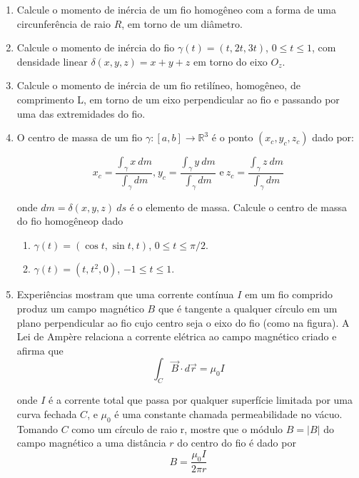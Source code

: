 \documentclass[11pt,a4paper]{article}
\begin{document}
\begin{enumerate}
\item Calcule o momento de inércia de um fio homogêneo com a forma de uma circunferência de raio $R$, em torno de um diâmetro. 

\item Calcule o momento de inércia do fio $\gamma (t) = (t \textrm{,}\ 2t \textrm{,}\ 3t)$, $0 \leq t \leq 1$, com densidade linear $\delta (x,y,z) = x + y + z$ em torno do eixo $O_z$.

\item Calcule o momento de inércia de um fio retilíneo, homogêneo, de comprimento L, em torno de um eixo perpendicular ao fio e passando por uma das extremidades do fio. 

\item O centro de massa de um fio $\gamma:[a,b] \to \mathbb{R}^3$ é o ponto $(x_c, y_c, z_c)$ dado por:

$$x_c = \displaystyle\dfrac{\displaystyle\int_\gamma x \ dm}{\displaystyle\int_\gamma dm} \textrm{,}\ y_c = \displaystyle\dfrac{\displaystyle\int_\gamma y \ dm}{\displaystyle\int_\gamma dm} \textrm{ e}\ z_c = \displaystyle\dfrac{\displaystyle\int_\gamma z \ dm}{\displaystyle\int_\gamma dm}$$

onde $dm = \delta(x,y,z) \ ds$ é o elemento de massa. Calcule o centro de massa do fio homogêneop dado

\begin{enumerate}
\item $\gamma (t) = (\cos t \textrm{,}\ \sin t \textrm{,}\ t)$, $0 \leq t \leq \pi/2 $.
\item $\gamma (t) = (t \textrm{,}\ t^2 \textrm{,}\ 0)$, $-1 \leq t \leq 1$.
\end{enumerate} 

\item Experiências mostram que uma corrente contínua $I$ em um fio comprido produz um campo magnético $B$ que é tangente a qualquer círculo em um plano perpendicular ao fio cujo centro seja o eixo do fio (como na figura). A Lei de Ampère relaciona a corrente elétrica ao campo magnético criado e afirma que
$$\displaystyle\int_ C \vec{B} \cdot d\vec{r} = \mu_0 I$$

onde $I$ é a corrente total que passa por qualquer superfície limitada por uma curva fechada $C$, e $\mu_0$ é uma constante chamada permeabilidade no vácuo. Tomando $C$ como um círculo de raio r, mostre que o módulo $B = |B|$ do campo magnético a uma distância $r$ do centro do fio é dado por
$$B = \displaystyle\dfrac{\mu_0 I}{2\pi r}$$


\end{enumerate}
\end{document}
